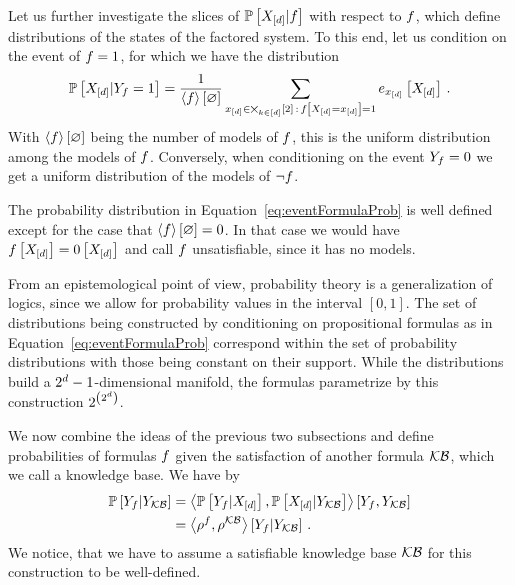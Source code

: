 Let us further investigate the slices of $\mathbb{P}\left[X_{[d]}|f\right]$ with respect to $f$, which define distributions of the states of the factored system.
To this end, let us condition on the event of $f=1$, for which we have the distribution
\begin{align}\label{eq:eventFormulaProb}
	\mathbb{P}\left[X_{[d]}|Y_{f}=1\right] = \frac{1}{\left\langle f\right\rangle \left[ \varnothing \right]}
	\sum_{x_{[d]}\in\bigtimes_{k\in[d]}[2] \, : \, f\left[X_{[d]}=x_{[d]}\right]=1} e_{x_{[d]}}\left[X_{[d]}\right] \, .
\end{align}
With $\left\langle f\right\rangle \left[ \varnothing \right]$ being the number of models of $f$, this is the uniform distribution among the models of $f$.
Conversely, when conditioning on the event $Y_{f}=0$ we get a uniform distribution of the models of $\lnot f$.

% 
The probability distribution in Equation~\eqref{eq:eventFormulaProb} is well defined except for the case that $\left\langle f\right\rangle \left[ \varnothing \right]=0$.
In that case we would have $f\left[X_{[d]}\right]=0\left[X_{[d]}\right]$ and call $f$ unsatisfiable, since it has no models.

From an epistemological point of view, probability theory is a generalization of logics, since we allow for probability values in the interval $[0,1]$.
The set of distributions being constructed by conditioning on propositional formulas as in Equation~\eqref{eq:eventFormulaProb} correspond within the set of probability distributions with those being constant on their support.
While the distributions build a $2^d-1$-dimensional manifold, the formulas parametrize by this construction $2^{\left(2^d\right)}$.%





We now combine the ideas of the previous two subsections and define probabilities of formulas $f$ given the satisfaction of another formula $\mathcal{KB}$, which we call a knowledge base.
We have by  %
\begin{align*}
	\mathbb{P}\left[Y_{f}|Y_{\mathcal{KB}}\right] 
	& = \left\langle 
	\mathbb{P}\left[Y_{f}|X_{[d]}\right], \mathbb{P}\left[X_{[d]}|Y_{\mathcal{KB}}\right]
	\right\rangle \left[ Y_{f},Y_{\mathcal{KB}} \right] \\
	& = \left\langle \rho^{f},\rho^{\mathcal{KB}}\right\rangle \left[ Y_{f} | Y_{\mathcal{KB}} \right] \, .
\end{align*}
We notice, that we have to assume a satisfiable knowledge base $\mathcal{KB}$ for this construction to be well-defined.

